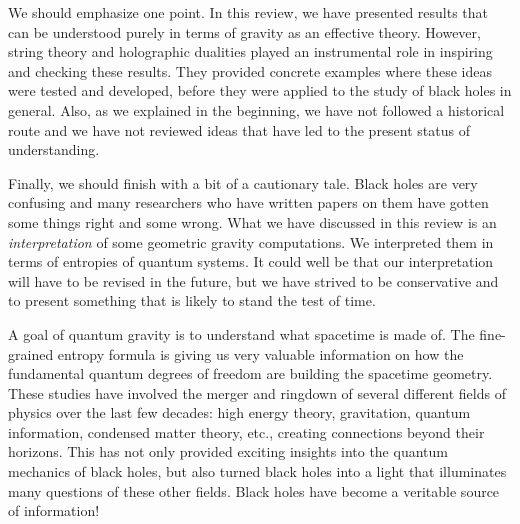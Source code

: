   

 
 
 We should emphasize one point. In this review,  we have presented results that can be understood purely in terms of gravity as an effective theory. However, string theory and holographic dualities played an  instrumental role in inspiring and checking these results. They provided concrete examples where these ideas were tested and developed,  before they were applied to the study of black holes in general. 
 Also, as we explained in the beginning, we have not followed a  historical route and we have not reviewed ideas that have led to the present status of understanding.    
   
  Finally, we should finish with a bit of a cautionary tale. Black holes are very confusing and many researchers who have written papers on them have gotten some things right and some wrong.  What we have discussed in this review is an {\it interpretation} of some geometric gravity computations. We interpreted them in terms of entropies of quantum systems. It could well be that our interpretation will have to be revised in the future, but we have strived to be conservative and to present something that is likely to stand the test of time. 

    
    

 
 
 
A goal of quantum gravity is to understand what spacetime is made of. The fine-grained entropy formula is giving us very valuable  information on how the fundamental quantum degrees of freedom are building the spacetime geometry. These studies have involved the merger and ringdown of several different fields of physics over the last few decades: high energy theory, gravitation, quantum information, condensed matter theory, etc.,  creating connections beyond their horizons. This has not only provided exciting insights into the quantum mechanics of black holes, but also turned black holes into a light that illuminates many questions of these other fields. Black holes have become a veritable source of information!
    
 
 
